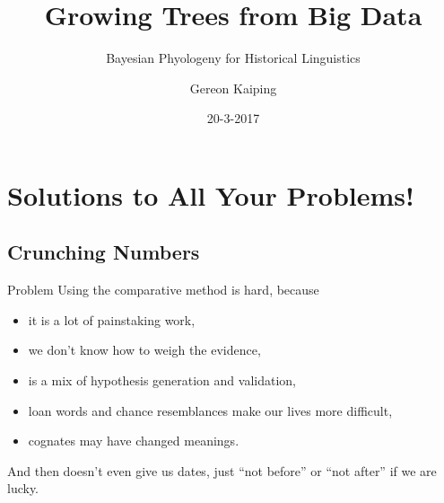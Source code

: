 \documentclass[9pt]{beamer}
\title{Growing Trees from Big Data}
\subtitle{Bayesian Phyologeny for Historical Linguistics}
\author{Gereon Kaiping}
\date{20-3-2017}
\begin{document}
\begin{frame}[plain]
  \titlepage
\end{frame}
\begin{frame}
  \tableofcontents
\end{frame}
\section{Solutions to All Your Problems!}
\subsection{Crunching Numbers}
\begin{frame}{Problem}
  Using the comparative method is hard, because
  \begin{itemize}
  \item it is a lot of painstaking work,
  \item we don't know how to weigh the evidence,
  \item is a mix of hypothesis generation and validation,
  \item loan words and chance resemblances make our lives more difficult,
  \item cognates may have changed meanings.
  \end{itemize}
  \pause
  And then doesn't even give us dates, just “not before” or “not after” if we are lucky.
\end{frame}
\end{document}
